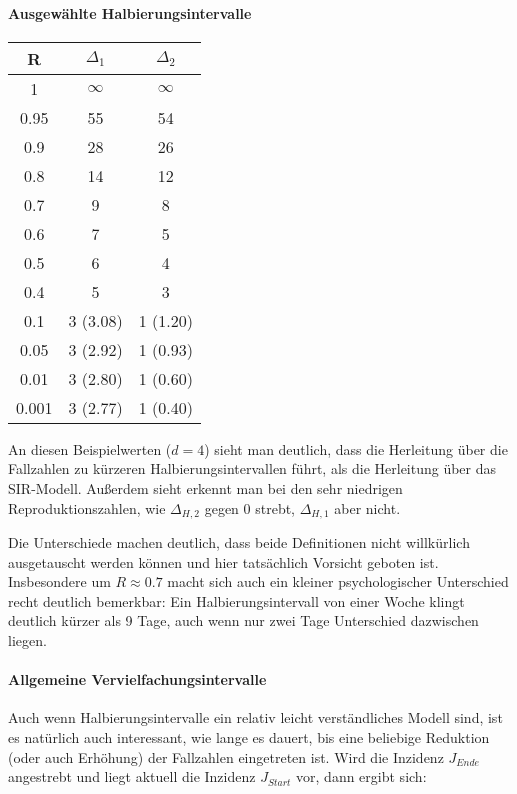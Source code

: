 \documentclass[a4paper]{article}
\begin{document}
    \paragraph{Ausgewählte Halbierungsintervalle}

    \begin{center}
        \begin{tabular}{ |c||c|c| } 
            \hline
                R & $\Delta_1$ & $\Delta_2$ \\
                \hline\hline
                1 & $\infty$ & $\infty$ \\ 
                0.95 & 55 & 54 \\ 
                0.9 & 28 & 26 \\ 
                0.8 & 14 & 12 \\ 
                0.7 & 9 & 8 \\ 
                0.6 & 7 & 5 \\ 
                0.5 & 6 & 4 \\ 
                0.4 & 5 & 3 \\ 
                0.1 & 3 (3.08) & 1 (1.20) \\ 
                0.05 & 3 (2.92) & 1 (0.93) \\ 
                0.01 & 3 (2.80) & 1 (0.60) \\ 
                0.001 & 3 (2.77) & 1 (0.40) \\ 
            \hline
        \end{tabular}
    \end{center}

    An diesen Beispielwerten ($d=4$) sieht man deutlich, dass die Herleitung über die Fallzahlen zu kürzeren Halbierungsintervallen führt, als die Herleitung über das SIR-Modell. Außerdem sieht erkennt man bei den sehr niedrigen Reproduktionszahlen, wie $\Delta_{H, 2}$ gegen $0$ strebt, $\Delta_{H, 1}$ aber nicht. 

    Die Unterschiede machen deutlich, dass beide Definitionen nicht willkürlich ausgetauscht werden können und hier tatsächlich Vorsicht geboten ist. Insbesondere um $R\approx0.7$ macht sich auch ein kleiner psychologischer Unterschied recht deutlich bemerkbar: Ein Halbierungsintervall von einer Woche klingt deutlich kürzer als 9 Tage, auch wenn nur zwei Tage Unterschied dazwischen liegen. 

    \paragraph{Allgemeine Vervielfachungsintervalle}Auch wenn Halbierungsintervalle ein relativ leicht verständliches Modell sind, ist es natürlich auch interessant, wie lange es dauert, bis eine beliebige Reduktion (oder auch Erhöhung) der Fallzahlen eingetreten ist. Wird die Inzidenz $J_{Ende}$ angestrebt und liegt aktuell die Inzidenz $J_{Start}$ vor, dann ergibt sich: 
    
\end{document}
